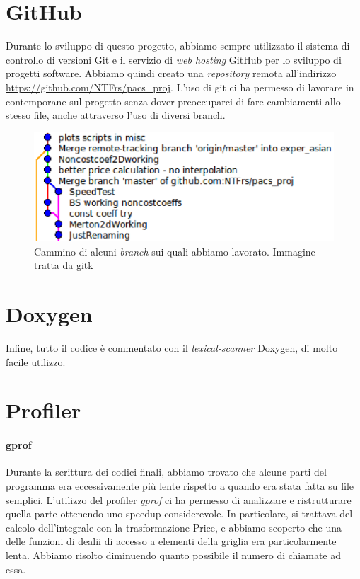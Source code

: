\documentclass[a4paper,10pt]{report}
\theoremstyle{plain}
\theoremstyle{definition}
\theoremstyle{remark}
\begin{document}
\section{GitHub}
Durante lo sviluppo di questo progetto, abbiamo sempre utilizzato il sistema di controllo di versioni Git e il servizio di \emph{web hosting} GitHub per lo sviluppo di progetti software. Abbiamo quindi creato una \emph{repository} remota all'indirizzo \url{https://github.com/NTFrs/pacs_proj}. L'uso di git ci ha permesso di lavorare in contemporane sul progetto senza dover preoccuparci di fare cambiamenti allo stesso file, anche attraverso l'uso di diversi branch.
\begin{figure}[!h]
 \centering
 \includegraphics[width=\textwidth]{img/Git.eps}
 \caption{Cammino di alcuni \emph{branch} sui quali abbiamo lavorato. Immagine tratta da \textsf{gitk}}
 \label{fig:gitk}
\end{figure}

\section{\textsf{Doxygen}}
Infine, tutto il codice \`e commentato con il \emph{lexical-scanner} \textsf{Doxygen}, di molto facile utilizzo. 

\section{Profiler}
\paragraph{gprof}
Durante la scrittura dei codici finali, abbiamo trovato che alcune parti del programma era eccessivamente più lente rispetto a quando era stata fatta su file semplici. L'utilizzo del profiler \emph{gprof} ci ha permesso di analizzare e ristrutturare quella parte ottenendo uno speedup considerevole. In particolare, si trattava del calcolo dell'integrale con la trasformazione Price, e abbiamo scoperto che una delle funzioni di dealii di accesso a elementi della griglia era particolarmente lenta. Abbiamo risolto diminuendo quanto possibile il numero di chiamate ad essa.
\end{document}
